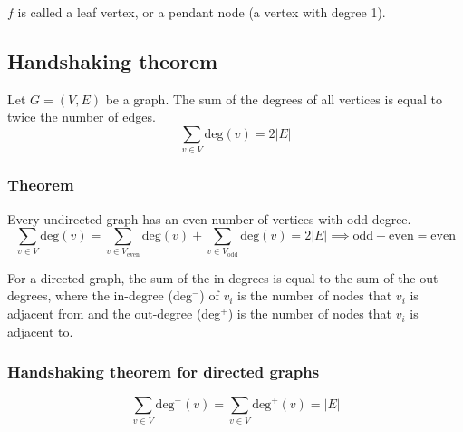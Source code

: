 \documentclass[11pt]{article}
\begin{document}
$f$ is called a leaf vertex, or a pendant node (a vertex with degree 1).

\subsection{Handshaking theorem}
Let $G = (V,E)$ be a graph. The sum of the degrees of all vertices is equal to twice the number of edges.
\[
\sum_{v \in V} \text{deg}(v) = 2|E|
\]

\subsubsection{Theorem}
Every undirected graph has an even number of vertices with odd degree.
\[
\sum_{v \in V} \text{deg}(v) = \sum_{v \in V_{\text{even}}} \text{deg}(v) + \sum_{v \in V_{\text{odd}}} \text{deg}(v) = 2|E| \implies \text{odd} + \text{even} = \text{even}
\]

For a directed graph, the sum of the in-degrees is equal to the sum of the out-degrees, where the in-degree (deg$^-$) of $v_i$ is the number of nodes that $v_i$ is adjacent from and the out-degree (deg$^+$) is the number of nodes that $v_i$ is adjacent to.

\subsubsection{Handshaking theorem for directed graphs}
\[
\sum_{v \in V} \text{deg}^-(v) = \sum_{v \in V} \text{deg}^+(v) = |E|
\]
\end{document}

